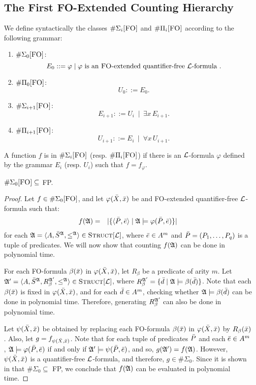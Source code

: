\subsection{The First {\sc FO}-Extended Counting Hierarchy}

We define syntactically the classes $\Eie$ and $\Eiu$ according to the following grammar:
\begin{enumerate}
	\item $\Eezero$:
	\[
		E_0 ::= \varphi \mid \varphi \mbox{ is an {\sc FO}-extended quantifier-free $\L$-formula }.
	\]
	\item $\Euzero$:
		\[U_0 ::= E_0.\]
	\item $\Eipe$:
	\[	E_{i+1} ::= U_i \ \mid \ \exists x \, E_{i+1}.\]
	\item $\Eipu$:
		\[U_{i+1} ::= E_i \ \mid \ \forall x \, U_{i+1}.\]
\end{enumerate}

A function $f$ is in $\Eie$ (resp. $\Eiu$) if there is an $\L$-formula $\varphi$ defined by the grammar $E_i$ (resp. $U_i$) such that $f = f_{\varphi}$.

\begin{theo} \label{fp1}
	$\Eo \subseteq$ {\sc FP}.
\end{theo}
\begin{proof}
	Let $f \in \Eo$, and let $\varphi(\X,\x)$ be and {\sc FO}-extended quantifier-free $\L$-formula such that:
	\begin{eqnarray*}
		f(\A) &=& \vert \{\langle \P,\e  \rangle \mid \A \models \varphi(\P,\e) \} \vert
	\end{eqnarray*}
	for each $\A = \langle A, \S^{\A}, \leq^{\A} \rangle \in \Truc$, where $\e \in A^m$ and $\P = (P_1,\ldots,P_q)$ is a tuple of predicates. We will now show that counting $f(\A)$ can be done in polynomial time.
	
	For each {\sc FO}-formula $\beta(\x)$ in $\varphi(\X,\x)$, let $R_{\beta}$ be a predicate of arity $m$. Let $\A^\prime = \langle A, \S^{\A}, R_{\beta}^{\A^\prime}, \leq^{\A} \rangle \in \Truc$, where $R_{\beta}^{\A^\prime} = \{\d \mid \A \models \beta(\d)\}$. Note that each $\beta(\x)$ is fixed in $\varphi(\X,\x)$, and for each $\d \in A^m$, checking whether $\A \models \beta(\d)$ can be done in polynomial time. Therefore, generating $R_{\beta}^{\A^\prime}$ can also be done in polynomial time.
	
	Let $\psi(\X,\x)$ be obtained by replacing each {\sc FO}-formula $\beta(\x)$ in $\varphi(\X,\x)$ by $R_{\beta}(\x)$. Also, let $g = f_{\psi(\X,\x)}$. Note that for each tuple of predicates $\P$ and each $\e \in A^m$, $\A \models \varphi(\P,\e)$ if and only if $\A^\prime \models \psi(\P,\e)$, and so, $g(\A^\prime) = f(\A)$. However, $\psi(\X,\x)$ is a quantifier-free $\L$-formula, and therefore, $g \in \#\Sigma_0$. Since it is shown in \cite{DBLP:journals/jcss/SalujaST95} that $\#\Sigma_0 \subseteq$ {\sc FP}, we conclude that $f(\A)$ can be evaluated in polynomial time.
	
\end{proof}

